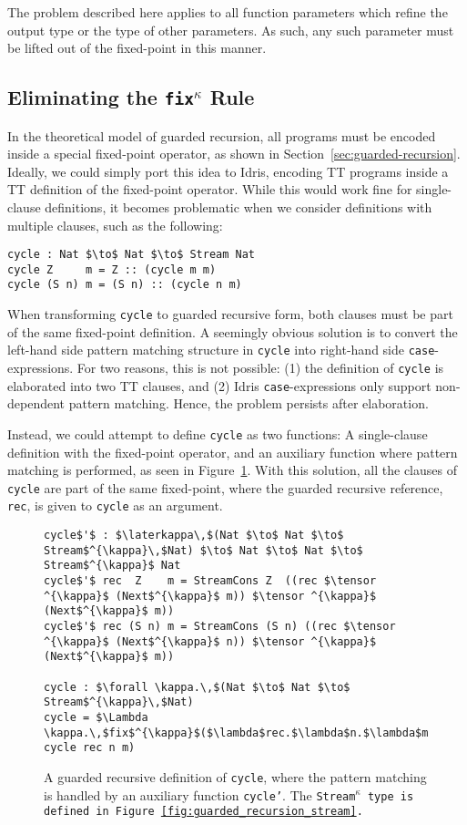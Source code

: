 The problem described here applies to all function parameters which refine the
output type or the type of other parameters. As such, any such parameter must be
lifted out of the fixed-point in this manner.


\subsection{Eliminating the \texttt{fix$^\kappa$} Rule}
\label{sec:fixkappa-rule}
In the theoretical model of guarded recursion, all programs must be encoded
inside a special fixed-point operator, as shown in
Section~\ref{sec:guarded-recursion}. Ideally, we could simply port this idea to
Idris, encoding TT programs inside a TT definition of the fixed-point
operator. While this would work fine for single-clause definitions, it becomes
problematic when we consider definitions with multiple clauses, such as the
following: 

\begin{lstlisting}[mathescape]
cycle : Nat $\to$ Nat $\to$ Stream Nat
cycle Z     m = Z :: (cycle m m)
cycle (S n) m = (S n) :: (cycle n m)
\end{lstlisting}

When transforming \texttt{cycle} to guarded recursive form, both clauses must be part
of the same fixed-point definition. A seemingly obvious solution is to convert
the left-hand side pattern matching structure in \texttt{cycle} into right-hand
side \texttt{case}-expressions. For two reasons, this is not possible: (1) the
definition of \texttt{cycle} is elaborated into two TT clauses, and (2) Idris
\texttt{case}-expressions only support non-dependent pattern matching. Hence,
the problem persists after elaboration.

Instead, we could attempt to define \texttt{cycle} as two functions: A
single-clause definition with the fixed-point operator, and an auxiliary
function where pattern matching is performed, as seen in
Figure~\ref{fig:cycle_guarded}. With this solution, all the clauses of
\texttt{cycle} are part of the same fixed-point, where the guarded recursive reference,
\texttt{rec}, is given to \texttt{cycle} as an argument.

\begin{figure}[h]
\begin{lstlisting}[mathescape]
cycle$'$ : $\laterkappa\,$(Nat $\to$ Nat $\to$ Stream$^{\kappa}\,$Nat) $\to$ Nat $\to$ Nat $\to$ Stream$^{\kappa}$ Nat
cycle$'$ rec  Z    m = StreamCons Z  ((rec $\tensor ^{\kappa}$ (Next$^{\kappa}$ m)) $\tensor ^{\kappa}$ (Next$^{\kappa}$ m))
cycle$'$ rec (S n) m = StreamCons (S n) ((rec $\tensor ^{\kappa}$ (Next$^{\kappa}$ n)) $\tensor ^{\kappa}$ (Next$^{\kappa}$ m))

cycle : $\forall \kappa.\,$(Nat $\to$ Nat $\to$ Stream$^{\kappa}\,$Nat)
cycle = $\Lambda \kappa.\,$fix$^{\kappa}$($\lambda$rec.$\lambda$n.$\lambda$m. cycle rec n m)
\end{lstlisting}
  \caption{A guarded recursive definition of \texttt{cycle}, where the pattern
    matching is handled by an auxiliary function \texttt{cycle'}. The
    \texttt{Stream$^\kappa$ type is defined in Figure~\ref{fig:guarded_recursion_stream}.} }
  \label{fig:cycle_guarded}
\end{figure}

